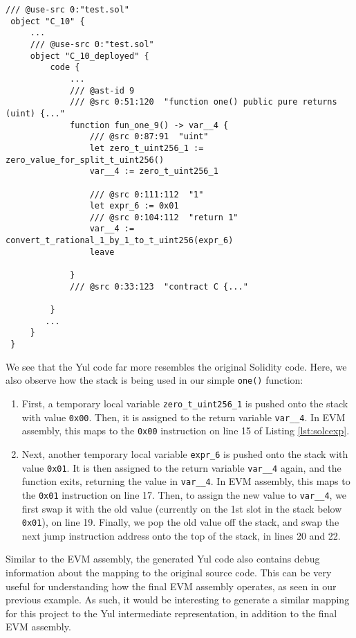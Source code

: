 \begin{lstlisting}[language=plantuml, caption={Yul IR from the Solidity compiler}, label={lst:solcexp}, basicstyle=\ttfamily\scriptsize]
 /// @use-src 0:"test.sol"
 object "C_10" {
     ...
     /// @use-src 0:"test.sol"
     object "C_10_deployed" {
         code {
             ...
             /// @ast-id 9
             /// @src 0:51:120  "function one() public pure returns (uint) {..."
             function fun_one_9() -> var__4 {
                 /// @src 0:87:91  "uint"
                 let zero_t_uint256_1 := zero_value_for_split_t_uint256()
                 var__4 := zero_t_uint256_1
 
                 /// @src 0:111:112  "1"
                 let expr_6 := 0x01
                 /// @src 0:104:112  "return 1"
                 var__4 := convert_t_rational_1_by_1_to_t_uint256(expr_6)
                 leave
 
             }
             /// @src 0:33:123  "contract C {..."
 
         }
        ...
     }
 }
\end{lstlisting}

We see that the Yul code far more resembles the original Solidity code. Here, we also
observe how the stack is being used in our simple \texttt{one()} function:

\begin{enumerate}
  \item First, a temporary local variable \texttt{zero\_t\_uint256\_1} is pushed onto the stack with value \texttt{0x00}. 
  Then, it is assigned to the return variable \texttt{var\_\_4}. In EVM assembly, this maps to
  the \texttt{0x00} instruction on line 15 of Listing \ref{lst:solcexp}.
  \item Next, another temporary local variable \texttt{expr\_6} is pushed onto the stack with
  value \texttt{0x01}. It is then assigned to the return variable \texttt{var\_\_4} again, and the function
  exits, returning the value in \texttt{var\_\_4}. In EVM assembly, this maps to the \texttt{0x01}
  instruction on line 17. Then, to assign the new value to \texttt{var\_\_4}, we first swap it with the
  old value (currently on the 1st slot in the stack below \texttt{0x01}), on line 19. Finally, we pop the
  old value off the stack, and swap the next jump instruction address onto the top of the stack, in
  lines 20 and 22.
\end{enumerate}

Similar to the EVM assembly, the generated Yul code also contains debug information about
the mapping to the original source code. This can be very useful for understanding how the
final EVM assembly operates, as seen in our previous example. As such, it would be
interesting to generate a similar mapping for this project to the Yul intermediate
representation, in addition to the final EVM assembly.

